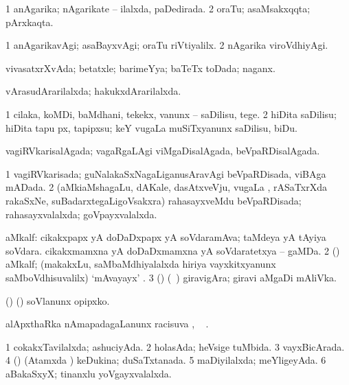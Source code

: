 \bentry
{} 
\gl{\gu}
\expl{}
\bmng
\bnum
\num{1} anAgarika; nAgarikate -- ilalxda, paDedirada. 
\num{2} oraTu; asaMsakxqqta; pArxkaqta. 
\enum
\emng
\eentry

\bentry
{} 
\gl{\kirxvi}
\expl{}
\bmng
\bnum
\num{1} anAgarikavAgi; asaBayxvAgi; oraTu riVtiyalilx. 
\num{2} nAgarika viroVdhiyAgi. 
\enum
\emng
\eentry

\bentry
{} 
\gl{\gu}
\expl{}
\bmng
vivasatxrXvAda; betatxle; barimeYya; baTeTx toDada; naganx. 
\emng
\eentry

\bentry
{} 
\gl{\gu}
\expl{}
\bmng
vArasudArarilalxda; hakukxdArarilalxda. 
\emng
\eentry

\bentry
{} 
\gl{\sakirx}
\expl{}
\bmng
\bnum
\num{1} cilaka, koMDi, baMdhani, tekekx, \mo vanunx -- saDilisu, tege. 
\num{2} hiDita saDilisu; hiDita tapu px, tapipxsu; keY \mo vugaLa muSiTxyanunx saDilisu, biDu. 
\enum
\emng
\eentry

\bentry
{} 
\gl{\gu}
\expl{}
\bmng
vagiRVkarisalAgada; vagaRgaLAgi viMgaDisalAgada, beVpaRDisalAgada. 
\emng
\eentry

\bentry
{} 
\gl{\gu}
\expl{}
\bmng
\bnum
\num{1} vagiRVkarisada; guNalakaSxNagaLiganusAravAgi beVpaRDisada, viBAga mADada. 
\num{2} (aMkiaMshagaLu, dAKale, dasAtxveVju, \mo vugaLa \vi, rASaTxrXda rakaSxNe, suBadarxtegaLigoVsakxra) rahasayxveMdu beVpaRDisada; rahasayxvalalxda; goVpayxvalalxda. 
\enum
\emng
\eentry

\bentry
{} 
\gl{\nA}
\bmng
\bnum
{} aMkalf: 
\banum
{} cikakxpapx yA doDaDxpapx yA soVdaramAva; taMdeya yA tAyiya soVdara. 
 cikakxmamxna yA doDaDxmamxna yA soVdaratetxya -- gaMDa. 
\eanum
\numie
\num{2} (\AmA) aMkalf; (makakxLu, saMbaMdhiyalalxda hiriya vayxkitxyanunx saMboVdhisuvalilx) `mAvayayx' . 
\num{3} (\ashi) (\kanmu\ \ca) giravigAra; giravi aMgaDi mAliVka. 
\enum
\emng

\noindent
\gl{\pagu}
\expl{}
\bmng
{} (\ame) (\AmA) soVlanunx opipxko. 
\emng
\eentry

\bentry
{} 
\gl{\uparx}
\expl{}
\bmng
alApxthaRka nAmapadagaLanunx racisuva \uparx, \udA\  
\emng
. \eentry

\bentry
{} 
\gl{\gu}
\expl{}
\bmng
\bnum
\num{1} cokakxTavilalxda; ashuciyAda. 
\num{2} holasAda; heVsige tuMbida. 
\num{3} vayxBicArada. 
\num{4} (\beY) (Atamxda \vi) keDukina; duSaTxtanada. 
\num{5} maDiyilalxda; meYligeyAda. 
\num{6} aBakaSxyX; tinanxlu yoVgayxvalalxda. 
\enum
\emng
\eentry

